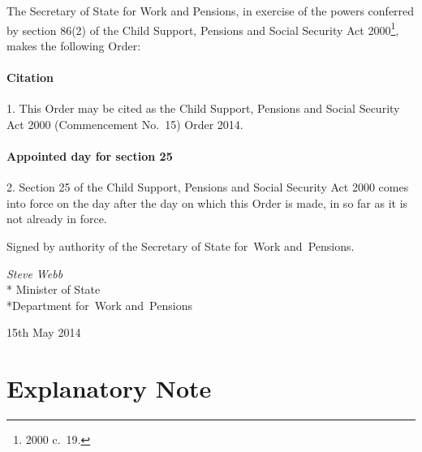 \documentclass[12pt,a4paper]{article}
\title{\regstitle}
\author{S.I.\ 2014 No.\ 1263 (C.~51)}
\date{Made
15th May 2014
}
\begin{document}
\maketitle

\enlargethispage{\baselineskip}

\noindent
The Secretary of State for Work and Pensions, in exercise of the powers conferred by section 86(2) of the Child Support, Pensions and Social Security Act 2000\footnote{2000 c.~19.}, makes the following Order: 

{\sloppy

\tableofcontents

}

\bigskip

\setcounter{secnumdepth}{-2}

\subsection[1. Citation]{Citation}

1.  This Order may be cited as the Child Support, Pensions and Social Security Act 2000 (Commencement No.~15) Order 2014.

\subsection[2. Appointed day for section 25]{Appointed day for section 25}

2.  Section 25 of the Child Support, Pensions and Social Security Act 2000 comes into force on the day after the day on which this Order is made, in so far as it is not already in force.  

\bigskip

\pagebreak[3]

Signed 
by authority of the 
Secretary of State for~Work and~Pensions.

{\raggedleft
\emph{Steve Webb}\\*
Minister
of State\\*Department 
for~Work and~Pensions

}

15th May 2014

\small

\part{Explanatory Note}
\end{document}
